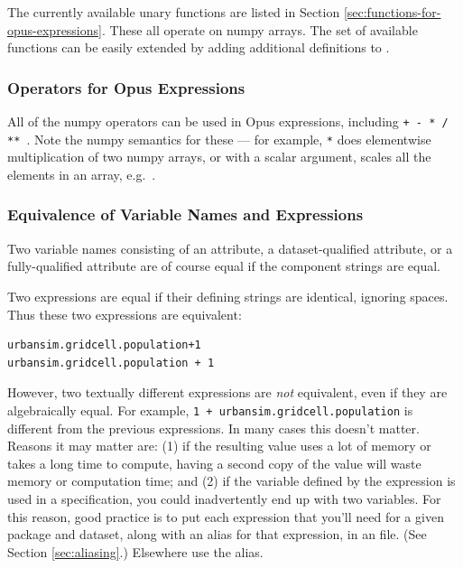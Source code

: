 {The currently available unary functions are listed in Section
\ref{sec:functions-for-opus-expressions}.  These all operate 
on numpy arrays.  The set of available functions can be easily 
extended by adding additional definitions to 
.

\subsubsection{Operators for Opus Expressions}

All of the numpy operators can be used in Opus expressions, including
\verb|+ - * / ** |.  Note the numpy semantics for these --- for example,
\verb|*| does elementwise multiplication of two numpy arrays, or with a
scalar argument, scales all the elements in an array,
e.g.\ .

\subsubsection{Equivalence of Variable Names and Expressions}

Two variable names consisting of an attribute, a dataset-qualified
attribute, or a fully-qualified attribute are of course equal if the
component strings are equal.

Two expressions are equal if their defining strings are identical, ignoring
spaces.  Thus these two expressions are equivalent:

\begin{verbatim}
urbansim.gridcell.population+1
urbansim.gridcell.population + 1
\end{verbatim}

However, two textually different expressions are \emph{not} equivalent,
even if they are algebraically equal.  For example,
\verb|1 + urbansim.gridcell.population| is different from the previous
expressions.  In many cases this doesn't matter.  Reasons it may matter
are: (1) if the resulting value uses a lot of memory or takes a long time
to compute, having a second copy of the value will waste memory or
computation time; and (2) if the variable defined by the expression is used
in a specification, you could inadvertently end up with two variables.  For
this reason, good practice is to put each expression that you'll need for a
given package and dataset, along with an alias for that expression, in an
 file.  (See Section \ref{sec:aliasing}.)  Elsewhere use
the alias.

}
